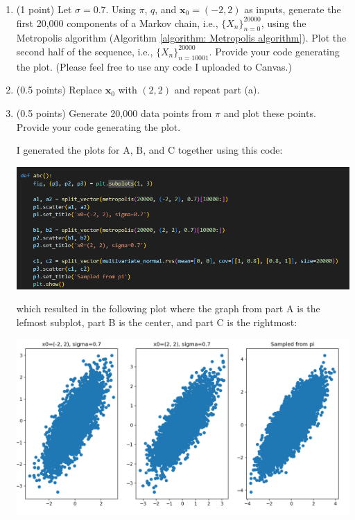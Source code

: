 \documentclass[11pt,letterpaper, leqno]{article}
\numberwithin{equation}{section}
\numberwithin{theorem}{section}
\numberwithin{lemma}{section}
\numberwithin{corollary}{section}
\numberwithin{definition}{section}
\numberwithin{proposition}{section}
\numberwithin{remark}{section}
\numberwithin{example}{section}
\begin{document}
\begin{enumerate}
    \color{black}

\pagebreak
\begin{enumerate}
    \item (1 point) Let $\sigma=0.7$. Using $\pi$, $q$, and $\boldsymbol{x}_0=(-2,2)$ as inputs, generate the first 20,000 components of a Markov chain, i.e., $\{X_n\}_{n=0}^{20000}$, using the Metropolis algorithm (Algorithm \ref{algorithm: Metropolis algorithm}). Plot the second half of the sequence, i.e., $\{X_n\}_{n=10001}^{20000}$. Provide your code generating the plot. (Please feel free to use any code I uploaded to Canvas.)
    \item (0.5 points) Replace $\boldsymbol{x}_0$ with $(2,2)$ and repeat part (a).
    \item (0.5 points) Generate 20,000 data points from $\pi$ and plot these points. Provide your code generating the plot. 
    
    \color{blue}
        I generated the plots for A, B, and C together using this code:

        \includegraphics[width=\textwidth]{Images/2. ABC Code.png}

        which resulted in the following plot where the graph from part A is the lefmost subplot, part B is the center, and part C is the rightmost:

        \includegraphics[width=\textwidth]{Images/2. ABC.png}
    \color{black}


\end{enumerate}
\end{enumerate}
\end{document}
